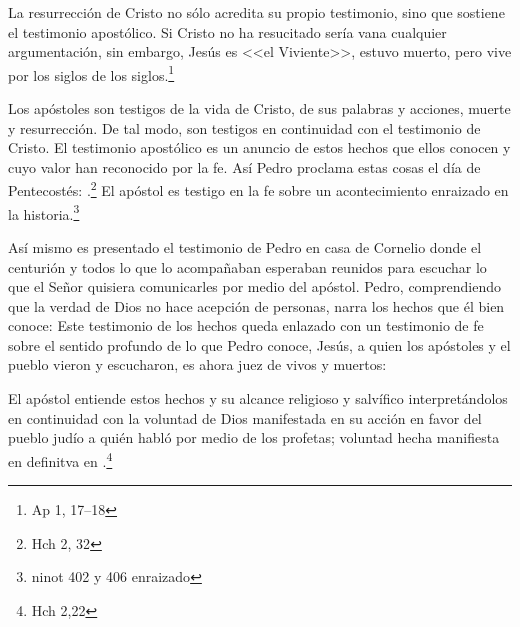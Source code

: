 La resurrección de Cristo no sólo acredita su propio testimonio, sino que
sostiene el testimonio apostólico. Si Cristo no ha resucitado sería vana
cualquier argumentación, sin embargo, Jesús es <<el Viviente>>, estuvo muerto,
pero vive por los siglos de los siglos.\footnote{Ap 1, 17--18}

Los apóstoles son testigos de la vida de Cristo, de sus palabras y acciones,
muerte y resurrección. De tal modo, son testigos en continuidad con el testimonio
de Cristo. El testimonio apostólico es un anuncio de estos hechos que ellos
conocen y cuyo valor han reconocido por la fe. Así Pedro proclama estas cosas el
día de Pentecostés: .\footnote{Hch 2, 32} El apóstol es testigo en
la fe sobre un acontecimiento enraizado en la historia.\footnote{ninot 402 y 406
  enraizado}

Así mismo es presentado el testimonio de Pedro en casa de Cornelio donde el
centurión y todos lo que lo acompañaban esperaban reunidos para escuchar lo que
el Señor quisiera comunicarles por medio del apóstol. Pedro, comprendiendo que
la verdad de Dios no hace acepción de personas, narra los hechos que él bien
conoce:  Este testimonio de los hechos queda
enlazado con un testimonio de fe sobre el sentido profundo de lo que Pedro
conoce, Jesús, a quien los apóstoles y el pueblo vieron y escucharon, es ahora
juez de vivos y muertos:

El apóstol entiende estos hechos y su alcance religioso y salvífico
interpretándolos en continuidad con la voluntad de Dios manifestada en su acción
en favor del pueblo judío a quién habló por medio de los profetas; voluntad
hecha manifiesta en definitva en .\footnote{Hch 2,22}

